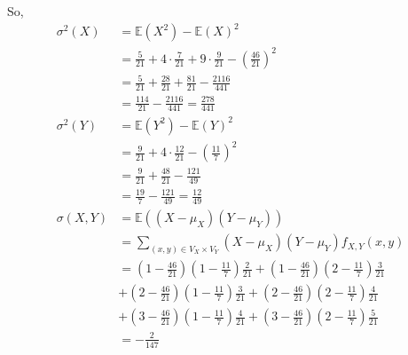 \documentclass[12pt]{article}
\begin{document}
\begin{enumerate}[start=1,label={\bfseries Problem \arabic*:},leftmargin=1in]
    So, \begin{align*}
        \sigma^{2}(X) &= \mathbb{E}(X^{2}) - \mathbb{E}(X)^{2}\\
        &= \frac{5}{21} + 4 \cdot \frac{7}{21} + 9 \cdot \frac{9}{21} - (\frac{46}{21})^{2} \\ 
        &= \frac{5}{21} + \frac{28}{21} + \frac{81}{21} - \frac{2116}{441} \\
        &= \frac{114}{21} - \frac{2116}{441} = \frac{278}{441}\\ 
        \sigma^{2}(Y) &= \mathbb{E}(Y^{2}) - \mathbb{E}(Y)^{2}\\ 
        &= \frac{9}{21} + 4\cdot\frac{12}{21}-(\frac{11}{7})^{2} \\ 
        &= \frac{9}{21} + \frac{48}{21} - \frac{121}{49}\\ 
        &= \frac{19}{7} - \frac{121}{49} = \frac{12}{49}\\ 
        \sigma(X,Y) &= \mathbb{E} ((X-\mu_{X})(Y-\mu_{Y}))\\ 
        &= \sum_{(x,y) \in V_{X} \times V_{Y}}(X-\mu_{X})(Y-\mu_{Y})f_{X, Y}(x, y)\\ 
        &= (1 - \frac{46}{21})(1-\frac{11}{7})\frac{2}{21} + (1- \frac{46}{21})(2 - \frac{11}{7})\frac{3}{21} \\ 
        &+ (2 - \frac{46}{21})(1-\frac{11}{7})\frac{3}{21} + (2-\frac{46}{21})(2-\frac{11}{7})\frac{4}{21}\\ 
        &+ (3 - \frac{46}{21})(1-\frac{11}{7})\frac{4}{21} + (3-\frac{46}{21})(2-\frac{11}{7})\frac{5}{21}\\ 
        &= -\frac{2}{147}
    \end{align*}
\end{enumerate}
\end{document}
